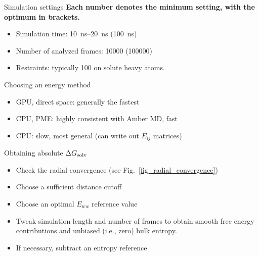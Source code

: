 \documentclass[9pt,tutorial]{livecoms}
\begin{document}
\begin{Checklists}[h]

\begin{checklist}{Simulation settings}
\textbf{Each number denotes the minimum setting, with the optimum in brackets.}
\begin{itemize}
	\item Simulation time: \SIrange{10}{20}{\nano\second} (\SI{100}{\nano\second})
	\item Number of analyzed frames: \num{10000} (\num{100000})
	\item Restraints: typically \SI{100}{\kcalPerMolASqr} on solute heavy atoms.
\end{itemize}
\end{checklist}

\begin{checklist}{Choosing an energy method}
\begin{itemize}
	\item GPU, direct space: generally the fastest
	\item CPU, PME: highly consistent with Amber MD, fast
	\item CPU: slow, most general (can write out $E_{ij}$ matrices)
\end{itemize}
\end{checklist}

\begin{checklist}{Obtaining absolute $\Delta G_\textup{solv}$}
\begin{itemize}
	\item Check the radial convergence (see Fig.~\ref{fig_radial_convergence})
	\item Choose a sufficient distance cutoff
	\item Choose an optimal $E_{ww}$ reference value
	\item Tweak simulation length and number of frames to obtain smooth free energy contributions and unbiased (i.e., zero) bulk entropy.
	\item If necessary, subtract an entropy reference
\end{itemize}
\end{checklist}

%


\end{Checklists}
\end{document}
